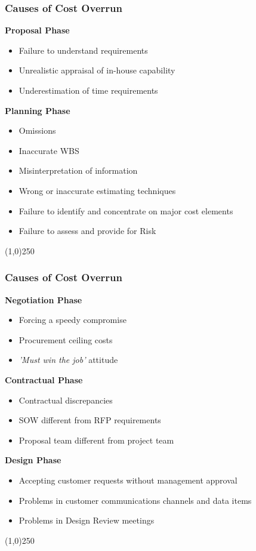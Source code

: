 \begin{frame}
\frametitle{Causes of Cost Overrun}
\textbf{Proposal Phase}
\begin{itemize}
	\item Failure to understand requirements
	\item Unrealistic appraisal of in-house capability
	\item Underestimation of time requirements
\end{itemize}
\textbf{Planning Phase}
\begin{itemize}
	\item Omissions
	\item Inaccurate WBS
	\item Misinterpretation of information
	\item Wrong or inaccurate estimating techniques
	\item Failure to identify and concentrate on major cost elements
	\item Failure to assess and provide for Risk
\end{itemize}
\end{frame}
\begin{center}\line(1,0){250}\end{center}






\begin{frame}
\frametitle{Causes of Cost Overrun}
\textbf{Negotiation Phase}
\begin{itemize}
	\item Forcing a speedy compromise
	\item Procurement ceiling costs
	\item \textit{'Must win the job'} attitude
\end{itemize}
\textbf{Contractual Phase}
\begin{itemize}
	\item Contractual discrepancies
	\item SOW different from RFP requirements
	\item Proposal team different from project team
\end{itemize}
\textbf{Design Phase}
\begin{itemize}
	\item Accepting customer requests without management approval
	\item Problems in customer communications channels and data items
	\item Problems in Design Review meetings
\end{itemize}
\end{frame}
\begin{center}\line(1,0){250}\end{center}






